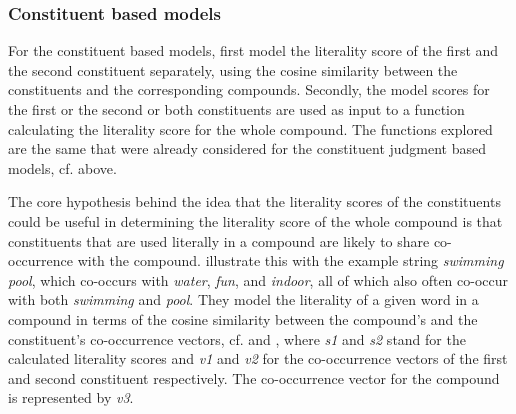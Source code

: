\subsubsection{Constituent based models}
For the constituent based models, \citet{Reddyetal:2011} first
model the literality score of the first and the second constituent
separately, using the cosine similarity between the constituents and
the corresponding compounds. Secondly, the
model scores for the first or the second or both constituents are used as
input to a function calculating the literality score for
the whole compound. The functions explored are the same that were
already considered for the constituent judgment based models, cf.  above.

The core hypothesis behind the idea that the literality scores of the
con\-stit\-u\-ents could be useful in determining the literality score of
the whole compound is that constituents that are used literally in a
compound are likely to share co-occurrence with the
compound. \citet[215]{Reddyetal:2011} illustrate this with the example
string \emph{swimming pool}, which co-occurs with \emph{water},
\emph{fun}, and \emph{indoor}, all of which also often co-occur with
both \emph{swimming} and \emph{pool}.
They model the literality of a given word in a compound in terms of
the cosine similarity between the compound's and
  the constituent's co-occurrence vectors, cf. \Next and \NNext, where
  \emph{s1} and \emph{s2} stand for the calculated literality scores and \emph{v1} and \emph{v2} for the
  co-occurrence vectors of the first
  and second constituent respectively. The co-occurrence vector
  for the compound is represented by \emph{v3}.

